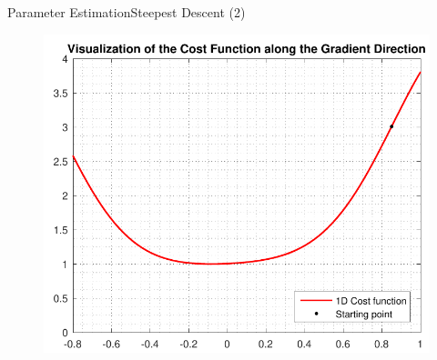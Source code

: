 \begin{frame}{Parameter Estimation}{Steepest Descent (2)}
  \begin{figure}[H]
    \centering
    \includegraphics[scale=0.33]{Pictures/gradientDIrection1D3}
  \end{figure}
\end{frame}

